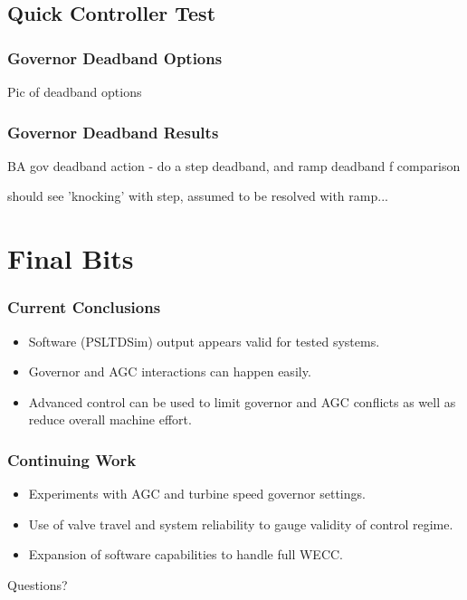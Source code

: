 \documentclass[14pt, unknownkeysallowed]{beamer}
\begin{document}
\subsection{Quick Controller Test}
\begin{frame}
\frametitle{Governor Deadband Options}
Pic of deadband options
\end{frame}
\begin{frame}
\frametitle{Governor Deadband Results}
BA gov deadband action - do a step deadband, and ramp deadband f comparison

should see 'knocking' with step, assumed to be resolved with ramp...
\end{frame}
\section{Final Bits}
\begin{frame}
\frametitle{Current Conclusions}
\begin{itemize}
	\item Software (PSLTDSim) output appears valid for tested systems.
	\item Governor and AGC interactions can happen easily.
	\item Advanced control can be used to limit governor and AGC conflicts as well as reduce overall machine effort.
\end{itemize}
\end{frame}
\begin{frame}
\frametitle{Continuing Work}
\begin{itemize}
\item Experiments with AGC and turbine speed governor settings.
\item Use of valve travel and system reliability to gauge validity of control regime.
\item Expansion of software capabilities to handle full WECC.
\end{itemize}
\end{frame}

\begin{frame}
\begin{center}
\Huge{Questions?}
\end{center}
\end{frame}
\end{document}
